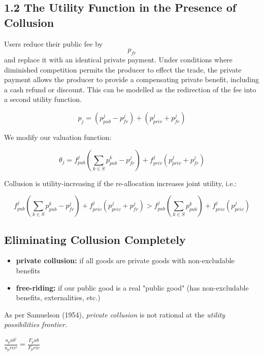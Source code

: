 \documentclass[oneside]{article}   	%
\begin{document}
\subsection*{1.2 The Utility Function in the Presence of Collusion}

Users reduce their public fee by $$p_{fr}$$ and replace it with an identical private payment. Under conditions where diminished competition permits the producer to effect the trade, the private payment allows the producer to provide a compensating private benefit, including a cash refund or discount. This can be modelled as the redirection of the fee into a second utility function.

$$
p_j = \left( p_{pub}^j - p_{fr}^j \right) + \left( p_{priv}^j + p_{fr}^j \right)
$$

We modify our valuation function:

$$
\theta_j = f_{pub}^j\left(\sum_{k \in S} p_{pub}^{k} - p_{fr}^j \right) + f_{priv}^j( p_{priv}^j + p_{fr}^j )
$$

Collusion is utility-increasing if the re-allocation increases joint utility, i.e.:

\[
f_{pub}^j\left(\sum_{k \in S} p_{pub}^{k} - p_{fr}^j \right) + f_{priv}^j( p_{priv}^j + p_{fr}^j )
> 
f_{pub}^j\left(\sum_{k \in S} p_{pub}^{k}\right) + f_{priv}^j(p_{priv}^j)
\]



\subsection*{Eliminating Collusion Completely}

\begin{itemize}
  \item \textbf{private collusion:} if all goods are private goods with non-excludable benefits
  \item \textbf{free-riding:} if our public good is a real "public good" (has non-excludable benefits, externalities, etc.)
\end{itemize}

As per Samuelson (1954), \textit{private collusion} is not rational at the \textit{utility possibilities frontier}.

\LARGE
\begin{adjustwidth}{1.5em}{1.5em}
\begin{math}
\frac{u_pub^i}{u_priv^i} = \frac{F_pub}{F_priv}
\end{math}
\end{adjustwidth}
\normalsize
\end{document}
